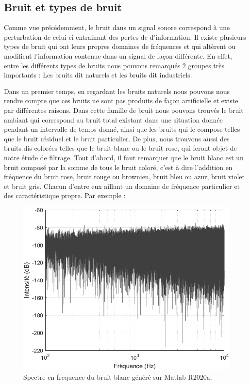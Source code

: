 \documentclass[conference,onecolumn]{IEEEtran}
\begin{document}
\subsection{Bruit et types de bruit}
Comme vue précédemment, le bruit dans un signal sonore correspond à une perturbation de celui-ci entrainant des pertes de d’information. Il existe plusieurs types de bruit qui ont leurs propres domaines de fréquences et qui altèrent ou modifient l’information contenue dans un signal de façon différente. En effet, entre les différents types de bruits nous pouvons remarqués 2 groupes très importants : Les bruits dit naturels et les bruits dit industriels.  

Dans un premier temps, en regardant les bruits naturels nous pouvons nous rendre compte que ces bruits ne sont pas produits de façon artificielle et existe par différentes raisons. Dans cette famille de bruit nous pouvons trouvés le bruit ambiant qui correspond au bruit total existant dans une situation donnée pendant un intervalle de temps donné, ainsi que les bruits qui le compose telles que le bruit résiduel et le bruit particulier. De plus, nous trouvons aussi des bruits dis colorées telles que le bruit blanc ou le bruit rose, qui feront objet de notre étude de filtrage. Tout d’abord, il faut remarquer que le bruit blanc est un bruit composé par la somme de tous le bruit coloré, c’est à dire l’addition en fréquence du bruit rose, bruit rouge ou brownien, bruit bleu ou azur, bruit violet et bruit gris. Chacun d’entre eux aillant un domaine de fréquence particulier et des caractéristique propre. Par exemple :\\

    \begin{figure}[H]
        \centering
        \includegraphics[scale=0.5]{img6.png}
        \caption{Spectre en frequence du bruit blanc généré sur Matlab R2020a.}
    \end{figure}
    
\end{document}
